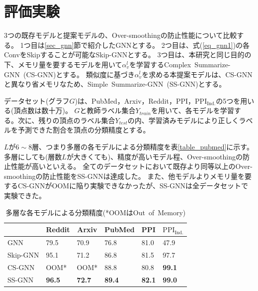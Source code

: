 \documentclass[a4j,twocolumn]{jsarticle}
\begin{document}
\section{評価実験}
\label{sec_experiment}

3つの既存モデルと提案モデルの、Over-smoothingの防止性能について比較する。
1つ目は\ref{sec_gnn}節で紹介したGNNとする。
2つ目は、式(\ref{eq_gnn1})の各ConvをSkipすることが可能なSkip-GNNとする。
3つ目は、本研究と同じ目的の下、メモリ量を要するモデルを用いて$\alpha_v^l$を学習するComplex~Summarize-GNN~(CS-GNN)とする。
類似度に基づき$\alpha_v^l$を求める本提案モデルは、CS-GNNと異なり省メモリなため、Simple~Summarize-GNN~(SS-GNN)とする。

データセット(グラフ$G$)は、PubMed，Arxiv，Reddit，PPI，$\text{PPI}_{\text{Ind.}}$の5つを用いる(頂点数は数十万)。
$G$と教師ラベル集合$Y_{train}$を用いて、各モデルを学習する。次に、残りの頂点のラベル集合$Y_{test}$の内、学習済みモデルにより正しくラベルを予測できた割合を頂点の分類精度とする。

$L$が$6\sim 8$層、つまり多層の各モデルによる分類精度を表\ref{table_pubmed}に示す。
多層にしても(層数$L$が大きくても)、精度が高いモデル程、Over-smoothingの防止性能が高いといえる。
全てのデータセットにおいて既存より同等以上のOver-smoothingの防止性能をSS-GNNは達成した。
また、他モデルよりメモリ量を要するCS-GNNがOOMに陥り実験できなかったが、SS-GNNは全データセットで実験できた。

\begin{table}[!h]
  \caption{多層な各モデルによる分類精度(*OOMはOut~of~Memory)}
  \vspace{-1mm}
  \begin{tabular}{|l|l|l|l|l|l|}
  \hline
  \multicolumn{1}{|c|}{} & \multicolumn{1}{c|}{Reddit} & \multicolumn{1}{c|}{Arxiv} & PubMed        & PPI           & $\text{PPI}_{\text{Ind.}}$ \\ \hline
  GNN                    & 79.5                        & 70.9                       & 76.8          & 81.0          & 47.9                       \\ \hline
  Skip-GNN               & 95.1                        & 71.2                       & 86.8          & 81.5          & 97.7                       \\ \hline
  CS-GNN                 & OOM*                         & OOM*                        & 88.8          & 80.8          & \textbf{99.1}              \\ \hline
  SS-GNN                 & \textbf{96.5}               & \textbf{72.7}              & \textbf{89.4} & \textbf{82.1} & \textbf{99.0}              \\ \hline
  \end{tabular}
\end{table}
\end{document}
